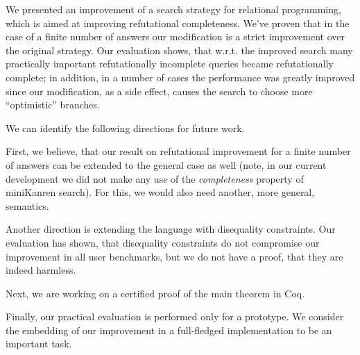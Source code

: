 We presented an improvement of a search strategy for relational programming, which is aimed at
improving refutational completeness. We've proven that in the case of a finite number of 
answers our modification is a strict improvement over the original strategy. Our evaluation 
shows, that w.r.t. the improved search many practically important refutationally incomplete 
queries became refutationally complete; in addition, in a number of cases the performance was greatly 
improved since our modification, as a side effect, causes the search to choose more 
``optimistic'' branches.

We can identify the following directions for future work. 

First, we believe, that our result on refutational improvement for a finite number of answers 
can be extended to the general case as well (note, in our current development we did not make 
any use of the \emph{completeness} property of miniKanren search). For this, we would also need 
another, more general, semantics. 

Another direction is extending the language with disequality constraints. Our evaluation has 
shown, that disequality constraints do not compromise our improvement in all user benchmarks, 
but we do not have a proof, that they are indeed harmless.

Next, we are working on a certified proof of the main theorem in Coq.

Finally, our practical evaluation is performed only for a prototype. 
We consider the embedding of our improvement in a full-fledged implementation to be
an important task.
